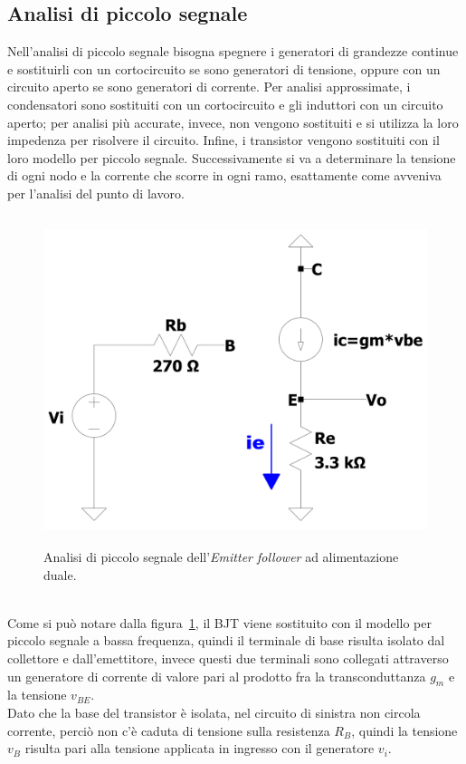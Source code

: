 \documentclass{report}
\begin{document}
\subsection{Analisi di piccolo segnale} 
Nell'analisi di piccolo segnale bisogna spegnere i generatori di grandezze continue e sostituirli con un cortocircuito se sono generatori di tensione, oppure con un circuito aperto se sono generatori di corrente. Per analisi approssimate, i condensatori sono sostituiti con un cortocircuito e gli induttori con un circuito aperto; per analisi più accurate, invece, non vengono sostituiti e si utilizza la loro impedenza per risolvere il circuito. Infine, i transistor vengono sostituiti con il loro modello per piccolo segnale. Successivamente si va a determinare la tensione di ogni nodo e la corrente che scorre in ogni ramo, esattamente come avveniva per l'analisi del punto di lavoro. 
\begin{figure}[h]
\centering
\includegraphics[height=9.6cm]{immagini/EFv1_ps}
\caption{Analisi di piccolo segnale dell'\textit{Emitter follower} ad alimentazione duale.}
\label{figura:EFv1_ps}
\end{figure}
\\Come si può notare dalla figura~\ref{figura:EFv1_ps}, il BJT viene sostituito con il modello per piccolo segnale a bassa frequenza, quindi il terminale di base risulta isolato dal collettore e dall'emettitore, invece questi due terminali sono collegati attraverso un generatore di corrente di valore pari al prodotto fra la transconduttanza $g_m$ e la tensione $v_{BE}$.
\\Dato che la base del transistor è isolata, nel circuito di sinistra non circola corrente, perciò non c'è caduta di tensione sulla resistenza $R_B$, quindi la tensione $v_B$ risulta pari alla tensione applicata in ingresso con il generatore $v_i$.
\end{document}
